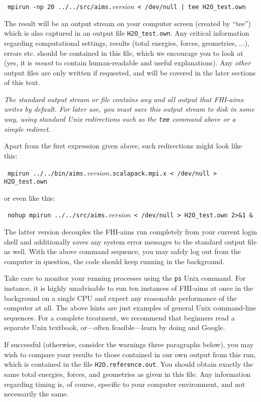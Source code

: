 {
  \verb+ mpirun -np 20 ../../src/aims.+\emph{version}\verb+ < /dev/null | tee H2O_test.own+
}

The result will be an output stream on your computer screen (created by
``tee'') which is also captured in an output file \texttt{H2O\_test.own}. 
Any critical information regarding computational
settings, results (total energies, forces, geometries, ...), errors
etc. should be contained in this file, which we encourage you to look at (yes,
it is \emph{meant} to contain human-readable and useful explanations). Any \emph{other} output files are  
only written if requested, and will be covered in the later sections of this
text.

\begin{center}
  \parbox[c]{0.8\textwidth}
  {
  \emph{The standard output stream or file contains any and all output that FHI-aims
  writes by default. For later use, you must save this output stream to disk in some way, 
  using standard Unix redirections such as the \texttt{tee} command above or a simple 
  redirect.}
  }
\end{center}

  Apart from the first expression given above, such 
  redirections might look like this: 

  {
    \verb+ mpirun ../../bin/aims.+\emph{version}\verb+.scalapack.mpi.x < /dev/null > H2O_test.own+
  }

  or even like this: 

  {
    \verb+ nohup mpirun ../../src/aims.+\emph{version}\verb+ < /dev/null > H2O_test.own 2>&1 &+
  }

  The latter version decouples the FHI-aims run completely from your
  current login shell and additionally
  saves any system error messages to the standard output file as well. With the above command sequence,
  you may safely log out from the computer in question, the code should keep running in the background. 

  Take care to monitor your running processes using the \texttt{ps} Unix command. For instance, it is
  highly unadvisable to run ten instances of FHI-aims at once in the background on a single CPU and expect
  any reasonable performance of the computer at all. The above hints
  are just examples of general Unix command-line sequences. For a complete treatment, we
  recommend that beginners read a separate Unix textbook, or---often feasible---learn by doing and Google. 

If successful (otherwise, consider the warnings three paragraphs below), you
may wish to compare your results to those contained in our 
own output from this run, which is contained in the file
\texttt{H2O.reference.out}. You should obtain exactly the same total energies,
forces, and geometries as given in this file. Any information regarding timing
is, of course, specific to your computer environment, and not necessarily the
same. 

